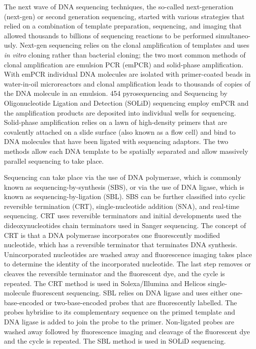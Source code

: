 The next wave of DNA sequencing techniques, the so-called next-generation (next-gen) or second generation sequencing, started with various strategies that relied on a combination of template preparation, sequencing, and imaging that allowed thousands to billions of sequencing reactions to be performed simultaneo-usly\cite{pmid19997069}. Next-gen sequencing relies on the clonal amplification of templates and uses \textit{in vitro} cloning rather than bacterial cloning; the two most common methods of clonal amplification are emulsion PCR (emPCR)\cite{pmid12857956} and solid-phase amplification\cite{pmid16473845}. With emPCR individual DNA molecules are isolated with primer-coated beads in water-in-oil microreactors and clonal amplification leads to thousands of copies of the DNA molecule in an emulsion. 454 pyrosequencing and Sequencing by Oligonucleotide Ligation and Detection (SOLiD) sequencing employ emPCR and the amplification products are deposited into individual wells for sequencing. Solid-phase amplification relies on a lawn of high-density primers that are covalently attached on a slide surface (also known as a flow cell) and bind to DNA molecules that have been ligated with sequencing adaptors. The two methods allow each DNA template to be spatially separated and allow massively parallel sequencing to take place.

Sequencing can take place via the use of DNA polymerase, which is commonly known as sequencing-by-synthesis (SBS), or via the use of DNA ligase, which is known as sequencing-by-ligation (SBL). SBS can be further classified into cyclic reversible termination (CRT), single-nucleotide addition (SNA), and real-time sequencing\cite{pmid19997069}. CRT uses reversible terminators and initial developments used the dideoxynucleotides chain terminators used in Sanger sequencing. The concept of CRT is that a DNA polymerase incorporates one fluorescently modified nucleotide, which has a reversible terminator that terminates DNA synthesis. Unincorporated nucleotides are washed away and fluorescence imaging takes place to determine the identity of the incorporated nucleotide. The last step removes or cleaves the reversible terminator and the fluorescent dye, and the cycle is repeated. The CRT method is used in Solexa/Illumina and Helicos single-molecule fluorescent sequencing. SBL relies on DNA ligase and uses either one-base-encoded or two-base-encoded probes that are fluorescently labelled. The probes hybridise to its complementary sequence on the primed template and DNA ligase is added to join the probe to the primer. Non-ligated probes are washed away followed by fluorescence imaging and cleavage of the fluorescent dye and the cycle is repeated. The SBL method is used in SOLiD sequencing.

